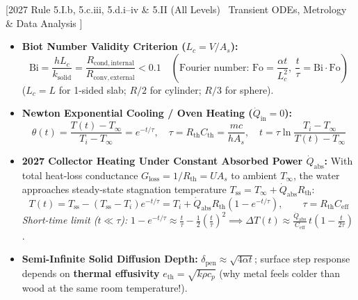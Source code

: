 \documentclass[10pt,twoside,openany,letterpaper]{book}
\begin{document}
\begin{quicksheet}\label{qr:11}
[2027 Rule 5.I.b, 5.c.iii, 5.d.i--iv \& 5.II (All Levels) \textbar\ Transient ODEs, Metrology \& Data Analysis ]

\begin{twocol}[0.50]
\begin{formulacard}
\scriptsize
\begin{itemize}
  \item \textbf{Biot Number Validity Criterion ($L_c = V/A_s$):}
  \[
    \boxed{\mathrm{Bi} = \frac{h L_c}{k_{\mathrm{solid}}} = \frac{R_{\mathrm{cond,internal}}}{R_{\mathrm{conv,external}}} < 0.1} \quad (\text{Fourier number: } \mathrm{Fo} = \frac{\alpha t}{L_c^2}, \ \frac{t}{\tau} = \mathrm{Bi}\cdot\mathrm{Fo})
  \]
  ($L_c = L$ for 1-sided slab; $R/2$ for cylinder; $R/3$ for sphere).
  \item \textbf{Newton Exponential Cooling / Oven Heating ($\dot{Q}_{\mathrm{in}} = 0$):}
  \[
    \boxed{\theta(t) = \frac{T(t) - T_\infty}{T_i - T_\infty} = e^{-t/\tau}}, \quad \boxed{\tau = R_{\mathrm{th}}C_{\mathrm{th}} = \frac{mc}{hA_s}}, \quad t = \tau\ln\frac{T_i - T_\infty}{T(t) - T_\infty}
  \]
  \item \textbf{2027 Collector Heating Under Constant Absorbed Power $\dot{Q}_{\mathrm{abs}}$:}
  With total heat-loss conductance $G_{\mathrm{loss}} = 1/R_{\mathrm{th}} = U A_s$ to ambient $T_\infty$, the water approaches steady-state stagnation temperature $T_{\mathrm{ss}} = T_\infty + \dot{Q}_{\mathrm{abs}}R_{\mathrm{th}}$:
  \[
    \boxed{T(t) = T_{\mathrm{ss}} - (T_{\mathrm{ss}} - T_i)e^{-t/\tau} = T_i + \dot{Q}_{\mathrm{abs}}R_{\mathrm{th}}\left(1 - e^{-t/\tau}\right)}, \qquad \tau = R_{\mathrm{th}}C_{\mathrm{eff}}
  \]
  \emph{Short-time limit ($t \ll \tau$):} $1 - e^{-t/\tau} \approx \frac{t}{\tau} - \frac{1}{2}\left(\frac{t}{\tau}\right)^2 \implies \Delta T(t) \approx \frac{\dot{Q}_{\mathrm{abs}}}{C_{\mathrm{eff}}}\,t\left(1 - \frac{t}{2\tau}\right)$.
  \item \textbf{Semi-Infinite Solid Diffusion Depth:} $\delta_{\mathrm{pen}} \approx \sqrt{4\alpha t}$; surface step response depends on \textbf{thermal effusivity} $e_{\mathrm{th}} = \sqrt{k\rho c_p}$ (why metal feels colder than wood at the same room temperature!).

\end{itemize}
\end{formulacard}
\end{twocol}
\end{quicksheet}
\end{document}
